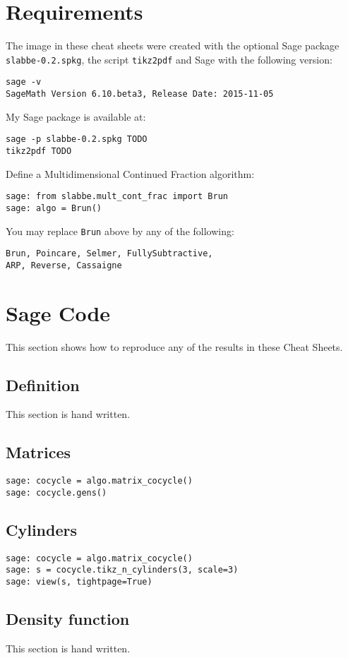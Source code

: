 \section{Requirements}
The image in these cheat sheets were created with the optional Sage package
\texttt{slabbe-0.2.spkg}, the script \texttt{tikz2pdf} and Sage with the
following version:
\begin{verbatim}
sage -v
SageMath Version 6.10.beta3, Release Date: 2015-11-05
\end{verbatim}
My Sage package is available at:
\begin{verbatim}
sage -p slabbe-0.2.spkg TODO
tikz2pdf TODO
\end{verbatim}
Define a Multidimensional Continued Fraction algorithm:
\begin{verbatim}
sage: from slabbe.mult_cont_frac import Brun
sage: algo = Brun()
\end{verbatim}
You may replace \texttt{Brun} above by any of the following:
\begin{verbatim}
Brun, Poincare, Selmer, FullySubtractive, 
ARP, Reverse, Cassaigne
\end{verbatim}
\section{Sage Code}
This section shows how to reproduce any of the results in these Cheat Sheets.
\subsection{Definition}
This section is hand written.
\subsection{Matrices}
\begin{verbatim}
sage: cocycle = algo.matrix_cocycle()
sage: cocycle.gens()
\end{verbatim}
\subsection{Cylinders}
\begin{verbatim}
sage: cocycle = algo.matrix_cocycle()
sage: s = cocycle.tikz_n_cylinders(3, scale=3)
sage: view(s, tightpage=True)
\end{verbatim}
\subsection{Density function}
This section is hand written.
